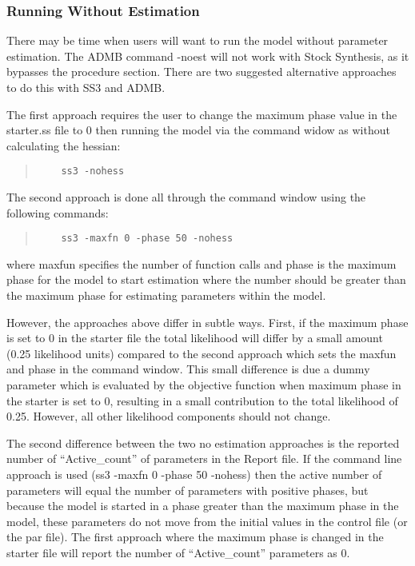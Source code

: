 \hypertarget{NoEst}{}
\subsubsection{Running Without Estimation}
There may be time when users will want to run the model without parameter estimation. The ADMB command -noest will not work with Stock Synthesis, as it bypasses the procedure section. There are two suggested alternative approaches to do this with SS3 and ADMB.  

The first approach requires the user to change the maximum phase value in the starter.ss file to 0 then running the model via the command widow as without calculating the hessian:

\begin{quote}
	\begin{verbatim}
	ss3 -nohess
	\end{verbatim}
\end{quote}

The second approach is done all through the command window using the following commands:

\begin{quote}
	\begin{verbatim}
	ss3 -maxfn 0 -phase 50 -nohess
	\end{verbatim}
\end{quote}

where maxfun specifies the number of function calls and phase is the maximum phase for the model to start estimation where the number should be greater than the maximum phase for estimating parameters within the model. 

However, the approaches above differ in subtle ways. First, if the maximum phase is set to 0 in the starter file the total likelihood will differ by a small amount (0.25 likelihood units) compared to the second approach which sets the maxfun and phase in the command window. This small difference is due a dummy parameter which is evaluated by the objective function when maximum phase in the starter is set to 0, resulting in a small contribution to the total likelihood of 0.25. However, all other likelihood components should not change.  

The second difference between the two no estimation approaches is the reported number of ``Active\_count'' of parameters in the Report file. If the command line approach is used (ss3 -maxfn 0 -phase 50 -nohess) then the active number of parameters will equal the number of parameters with positive phases, but because the model is started in a phase greater than the maximum phase in the model, these parameters do not move from the initial values in the control file (or the par file). The first approach where the maximum phase is changed in the starter file will report the number of ``Active\_count'' parameters as 0.  

